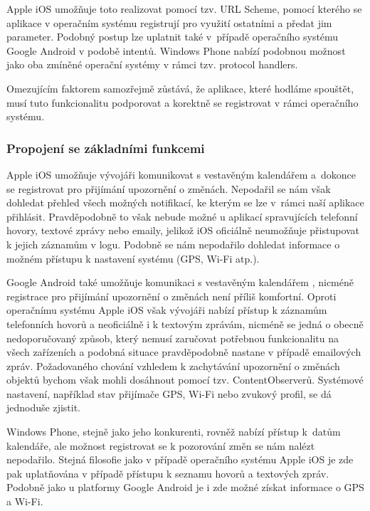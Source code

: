 \documentclass[thesis=M,czech]{FITthesis}[2012/06/26]
\begin{document}
Apple iOS umožňuje toto realizovat pomocí tzv. URL Scheme\cite{apple_url_scheme}, pomocí kterého se aplikace v operačním systému registrují pro využití ostatními \cite{apple_app_launch} a předat jim parameter\cite{apple_app_launch2}. Podobný postup lze uplatnit také v~případě operačního systému Google Android v podobě intentů\cite{android_app_launch}. Windows Phone nabízí podobnou možnost jako oba zmíněné operační systémy v rámci tzv. protocol handlers\cite{win_app_launch}.

Omezujícím faktorem samozřejmě zůstává, že aplikace, které hodláme spouštět, musí tuto funkcionalitu podporovat a korektně se registrovat v rámci operačního systému.

\subsubsection*{Propojení se základními funkcemi}
Apple iOS umožňuje vývojáři komunikovat s vestavěným kalendářem a~dokonce se registrovat pro přijímání upozornění o změnách\cite{apple_listener}. Nepodařil se nám však dohledat přehled všech možných notifikací, ke kterým se lze v~rámci naší aplikace přihlásit. Pravděpodobně to však nebude možné u aplikací spravujících telefonní hovory, textové zprávy nebo emaily, jelikož iOS oficiálně neumožňuje přistupovat k jejich záznamům v logu\cite{apple_history}. Podobně se nám nepodařilo dohledat informace o možném přístupu k nastavení systému (GPS, Wi-Fi atp.).

Google Android také umožňuje komunikaci s vestavěným kalendářem \cite{android_calendar}\cite{android_calendar2}, nicméně registrace pro přijímání upozornění o změnách není příliš komfortní\cite{android_calendar3}\cite{android_calendar4}. Oproti operačnímu systému Apple iOS však vývojáři nabízí přístup k záznamům telefonních hovorů\cite{android_calllog} a neoficiálně i k textovým zprávám, nicméně se jedná o obecně nedoporučovaný způsob, který nemusí zaručovat potřebnou funkcionalitu na všech zařízeních\cite{android_sms} a podobná situace pravděpodobně nastane v případě emailových zpráv. Požadovaného chování vzhledem k zachytávání upozornění o změnách objektů bychom však mohli dosáhnout pomocí tzv. ContentObserverů\cite{android_observer}. Systémové nastavení, například stav přijímače GPS\cite{android_gps}, Wi-Fi\cite{android_wifi} nebo zvukový profil\cite{android_profile}, se dá jednoduše zjistit.

Windows Phone, stejně jako jeho konkurenti, rovněž nabízí přístup k~datům kalendáře\cite{win_calendar}, ale možnost registrovat se k pozorování změn se nám nalézt nepodařilo. Stejná filosofie jako v případě operačního systému Apple iOS je zde pak uplatňována v případě přístupu k seznamu hovorů a textových zpráv\cite{win_incoming_event}. Podobně jako u platformy Google Android je i zde možné získat informace o GPS\cite{win_location} a Wi-Fi\cite{win_wifi}.
\end{document}
